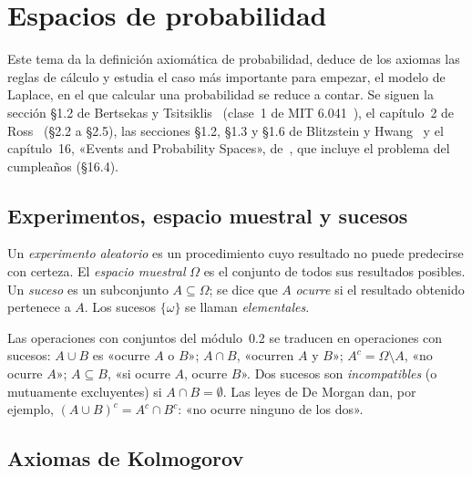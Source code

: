 \chapter{Espacios de probabilidad}
\label{tema:3}

Este tema da la definición axiomática de probabilidad, deduce de los axiomas las reglas de cálculo y estudia el caso más importante para empezar, el modelo de Laplace, en el que calcular una probabilidad se reduce a contar. Se siguen la sección §1.2 de Bertsekas y Tsitsiklis~\cite{bt} (clase~1 de MIT 6.041~\cite{mit6041f10}), el capítulo~2 de Ross~\cite{ross} (§2.2 a §2.5), las secciones §1.2, §1.3 y §1.6 de Blitzstein y Hwang~\cite{bh} y el capítulo~16, «Events and Probability Spaces», de~\cite{mcs}, que incluye el problema del cumpleaños (§16.4).

\section{Experimentos, espacio muestral y sucesos}

\begin{definicion}
Un \emph{experimento aleatorio} es un procedimiento cuyo resultado no puede predecirse con certeza. El \emph{espacio muestral} $\Omega$ es el conjunto de todos sus resultados posibles. Un \emph{suceso} es un subconjunto $A\subseteq\Omega$; se dice que $A$ \emph{ocurre} si el resultado obtenido pertenece a $A$. Los sucesos $\{\omega\}$ se llaman \emph{elementales}.
\end{definicion}

Las operaciones con conjuntos del módulo~0.2 se traducen en operaciones con sucesos: $A\cup B$ es «ocurre $A$ o $B$»; $A\cap B$, «ocurren $A$ y $B$»; $A^{c}=\Omega\setminus A$, «no ocurre $A$»; $A\subseteq B$, «si ocurre $A$, ocurre $B$». Dos sucesos son \emph{incompatibles} (o mutuamente excluyentes) si $A\cap B=\emptyset$. Las leyes de De Morgan dan, por ejemplo, $(A\cup B)^{c}=A^{c}\cap B^{c}$: «no ocurre ninguno de los dos».

\addtocounter{definicion}{1}%

\section{Axiomas de Kolmogorov}

